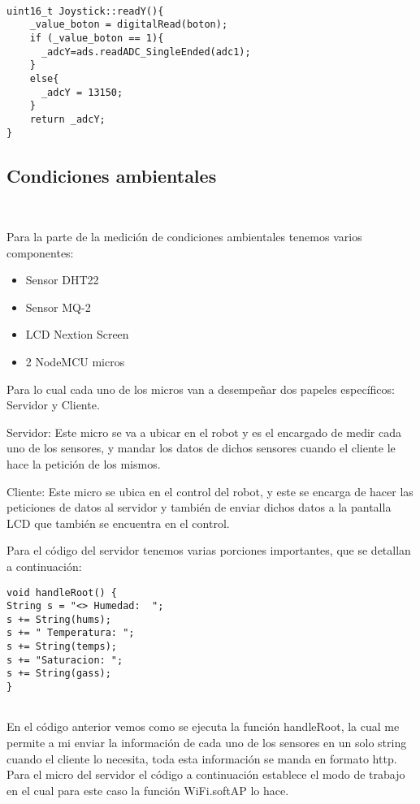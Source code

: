 \documentclass[12pt,letterpaper]{IEEEtran}
\begin{document}
\begin{lstlisting}

uint16_t Joystick::readY(){
    _value_boton = digitalRead(boton);
    if (_value_boton == 1){
      _adcY=ads.readADC_SingleEnded(adc1);
    }
    else{
      _adcY = 13150;
    }
    return _adcY;
}

\end{lstlisting}

\subsection{Condiciones ambientales}\

Para la parte de la medición de condiciones ambientales tenemos varios componentes: \\

\begin{itemize}
 \item Sensor DHT22
 \item Sensor MQ-2
 \item LCD Nextion Screen
 \item 2 NodeMCU micros \\
\end{itemize}

Para lo cual cada uno de los micros van a desempeñar dos papeles específicos: Servidor y Cliente.

Servidor: Este micro se va a ubicar en el robot y es el encargado de medir cada uno de los sensores, y mandar los datos de dichos sensores cuando el cliente le hace la petición de los mismos.

Cliente: Este micro se ubica en el control del robot, y este se encarga de hacer las peticiones de datos al servidor y también de enviar dichos datos a la pantalla LCD que también se encuentra en el control. 


 Para el código del servidor tenemos varias porciones importantes, que se detallan  a continuación:
 
 
 \begin{lstlisting}
void handleRoot() {
String s = "<> Humedad:  ";
s += String(hums);
s += " Temperatura: ";
s += String(temps);
s += "Saturacion: ";
s += String(gass);
}


\end{lstlisting}
 
  En el código anterior vemos como se ejecuta la función handleRoot, la cual me permite a mi enviar la información de cada uno de los sensores en un solo string cuando el cliente lo necesita, toda esta información se manda en formato http.
  Para el micro del servidor el código a continuación establece el modo de trabajo en el cual para este caso la función WiFi.softAP lo hace.
  
\end{document}
